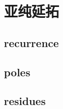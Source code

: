\section{亚纯延拓}
\label{b3:sec:2102}


\subsection{recurrence}
\label{b3:subsec:210201}

\subsection{poles}
\label{b3:subsec:210202}

\subsection{residues}
\label{b3:subsec:210203}


